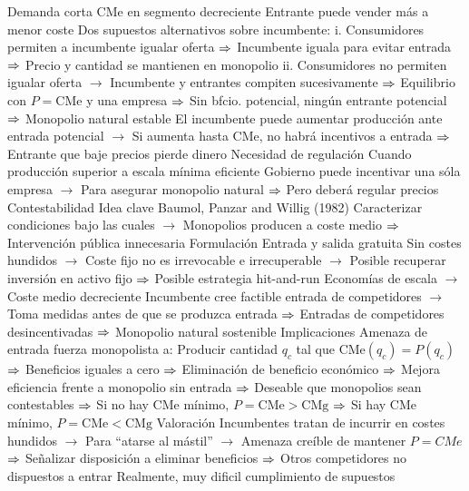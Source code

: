 \documentclass{nuevotema}
\begin{document}
\begin{esquemal}
				\4[] Demanda corta CMe en segmento decreciente
				\4[] Entrante puede vender más a menor coste
				\4[] Dos supuestos alternativos sobre incumbente:
				\4[] i. Consumidores permiten a incumbente igualar oferta
				\4[] $\Rightarrow$ Incumbente iguala para evitar entrada
				\4[] $\Rightarrow$ Precio y cantidad se mantienen en monopolio
				\4[] ii. Consumidores no permiten igualar oferta
				\4[] $\to$ Incumbente y entrantes compiten sucesivamente
				\4[] $\Rightarrow$ Equilibrio con $P=\text{CMe}$ y una empresa
				\4[] $\Rightarrow$ Sin bfcio. potencial, ningún entrante potencial
				\4[] $\Rightarrow$ Monopolio natural estable
				\4[] El incumbente puede aumentar producción ante entrada potencial
				\4[] $\to$ Si aumenta hasta CMe, no habrá incentivos a entrada
				\4[] $\Rightarrow$ Entrante que baje precios pierde dinero
				\4 Necesidad de regulación
				\4[] Cuando producción superior a escala mínima eficiente
				\4[] Gobierno puede incentivar una sóla empresa
				\4[] $\to$ Para asegurar monopolio natural
				\4[] $\Rightarrow$ Pero deberá regular precios
			\3 Contestabilidad
				\4 Idea clave
				\4[] Baumol, Panzar and Willig (1982)
				\4[] Caracterizar condiciones bajo las cuales
				\4[] $\to$ Monopolios producen a coste medio
				\4[] $\Rightarrow$ Intervención pública innecesaria
				\4 Formulación
				\4[] Entrada y salida gratuita
				\4[] Sin costes hundidos
				\4[] $\to$ Coste fijo no es irrevocable e irrecuperable
				\4[] $\to$ Posible recuperar inversión en activo fijo
				\4[] $\Rightarrow$ Posible estrategia hit-and-run
				\4[] Economías de escala
				\4[] $\to$ Coste medio decreciente
				\4[] Incumbente cree factible entrada de competidores
				\4[] $\to$ Toma medidas antes de que se produzca entrada
				\4[] $\Rightarrow$ Entradas de competidores desincentivadas
				\4[] $\Rightarrow$ Monopolio natural sostenible
				\4 Implicaciones
				\4[] Amenaza de entrada fuerza monopolista a:
				\4[] Producir cantidad $q_c$ tal que $\text{CMe}(q_c) = P(q_c)$
				\4[] $\Rightarrow$ Beneficios iguales a cero
				\4[] $\Rightarrow$ Eliminación de beneficio económico
				\4[] $\Rightarrow$ Mejora eficiencia frente a monopolio sin entrada
				\4[] $\Rightarrow$ Deseable que monopolios sean contestables
				\4[] $\Rightarrow$ Si no hay CMe mínimo, $P=\text{CMe} > \text{CMg}$
				\4[] $\Rightarrow$ Si hay CMe mínimo, $P=\text{CMe} < \text{CMg}$
				\4 Valoración
				\4[] Incumbentes tratan de incurrir en costes hundidos
				\4[] $\to$ Para ``atarse al mástil''
				\4[] $\to$ Amenaza creíble de mantener $P=CMe$
				\4[] $\Rightarrow$ Señalizar disposición a eliminar beneficios
				\4[] $\Rightarrow$ Otros competidores no dispuestos a entrar
				\4[] Realmente, muy dificil cumplimiento de supuestos

\end{esquemal}
\end{document}
